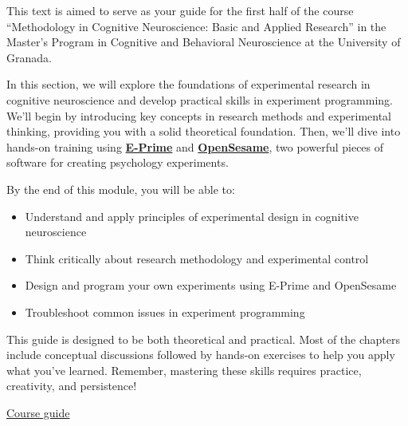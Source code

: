 \documentclass[
  letterpaper,
  DIV=11,
  numbers=noendperiod]{scrreprt}
\providecommand{\tightlist}{%
  \setlength{\itemsep}{0pt}\setlength{\parskip}{0pt}}\usepackage{longtable,booktabs,array}
\begin{document}
This text is aimed to serve as your guide for the first half of the
course ``Methodology in Cognitive Neuroscience: Basic and Applied
Research'' in the Master's Program in Cognitive and Behavioral
Neuroscience at the University of Granada.

In this section, we will explore the foundations of experimental
research in cognitive neuroscience and develop practical skills in
experiment programming. We'll begin by introducing key concepts in
research methods and experimental thinking, providing you with a solid
theoretical foundation. Then, we'll dive into hands-on training using
\href{https://pstnet.com/products/e-prime/}{\textbf{E-Prime}} and
\href{https://osdoc.cogsci.nl/}{\textbf{OpenSesame}}, two powerful
pieces of software for creating psychology experiments.

By the end of this module, you will be able to:

\begin{itemize}
\tightlist
\item
  Understand and apply principles of experimental design in cognitive
  neuroscience
\item
  Think critically about research methodology and experimental control
\item
  Design and program your own experiments using E-Prime and OpenSesame
\item
  Troubleshoot common issues in experiment programming
\end{itemize}

This guide is designed to be both theoretical and practical. Most of the
chapters include conceptual discussions followed by hands-on exercises
to help you apply what you've learned. Remember, mastering these skills
requires practice, creativity, and persistence!

\begin{tcolorbox}[enhanced jigsaw, titlerule=0mm, left=2mm, colbacktitle=quarto-callout-tip-color!10!white, toptitle=1mm, colframe=quarto-callout-tip-color-frame, opacityback=0, leftrule=.75mm, title=\textcolor{quarto-callout-tip-color}{\faLightbulb}\hspace{0.5em}{Relevant links}, coltitle=black, breakable, colback=white, bottomrule=.15mm, bottomtitle=1mm, arc=.35mm, toprule=.15mm, opacitybacktitle=0.6, rightrule=.15mm]

\href{https://masteres.ugr.es/neurocg/docencia/plan-estudios/guia-docente/M30/56/2/27}{Course
guide}

\end{tcolorbox}
\end{document}
